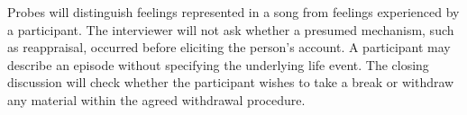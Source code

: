 Probes will distinguish feelings represented in a song from feelings experienced by a participant. The interviewer will not ask whether a presumed mechanism, such as reappraisal, occurred before eliciting the person's account. A participant may describe an episode without specifying the underlying life event. The closing discussion will check whether the participant wishes to take a break or withdraw any material within the agreed withdrawal procedure.
